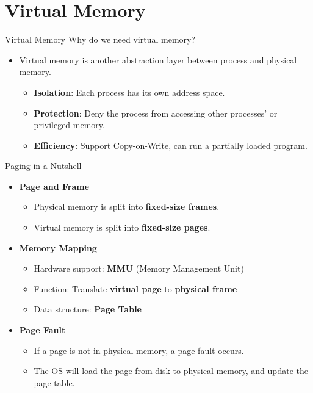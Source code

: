 \section{Virtual Memory}

\begin{frame}[fragile]{Virtual Memory}
	 Why do we need virtual memory?
	\begin{itemize}
		\item Virtual memory is another abstraction layer between process and physical memory.
		      \begin{itemize}
			      \item<1-> \textbf{Isolation}: Each process has its own address space.
			      \item<2-> \textbf{Protection}: Deny the process from accessing other processes' or privileged memory.
			      \item<3-> \textbf{Efficiency}: Support Copy-on-Write, can run a partially loaded program.
		      \end{itemize}
	\end{itemize}


\end{frame}

\begin{frame}[fragile]{Paging in a Nutshell}

	\begin{itemize}
		\item<1-> \textbf{Page and Frame}
		      \begin{itemize}
			      \item Physical memory is split into \textbf{fixed-size frames}.
			      \item Virtual memory is split into \textbf{fixed-size pages}.
		      \end{itemize}
		\item<2-> \textbf{Memory Mapping}
		      \begin{itemize}
			      \item Hardware support: \textbf{MMU} (Memory Management Unit)
			      \item Function: Translate \textbf{virtual page} to \textbf{physical frame}
			      \item Data structure: \textbf{Page Table}
		      \end{itemize}
		\item<3-> \textbf{Page Fault}
		      \begin{itemize}
			      \item If a page is not in physical memory, a page fault occurs.
			      \item The OS will load the page from disk to physical memory, and update the page table.
		      \end{itemize}
	\end{itemize}

\end{frame}

